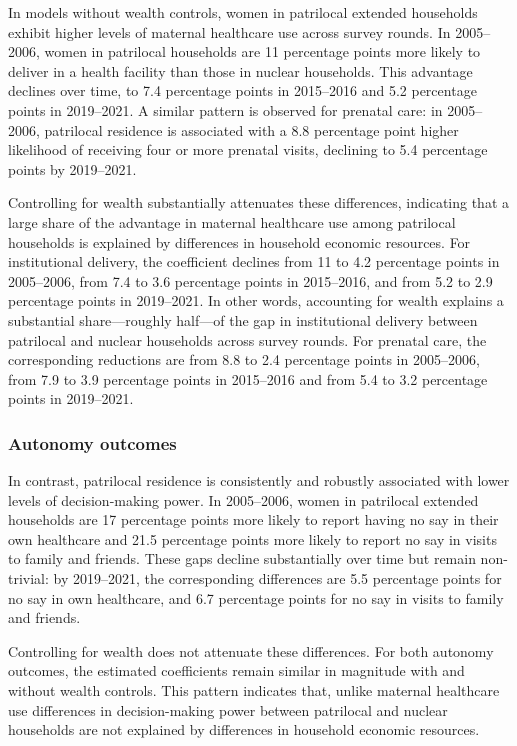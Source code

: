 \documentclass[12pt]{article}
\begin{document}
In models without wealth controls, women in patrilocal extended households exhibit higher levels of maternal healthcare use across survey rounds. In 2005–2006, women in patrilocal households are 11 percentage points more likely to deliver in a health facility than those in nuclear households. This advantage declines over time, to 7.4 percentage points in 2015–2016 and 5.2 percentage points in 2019–2021. A similar pattern is observed for prenatal care: in 2005–2006, patrilocal residence is associated with a 8.8 percentage point higher likelihood of receiving four or more prenatal visits, declining to 5.4 percentage points by 2019–2021.

Controlling for wealth substantially attenuates these differences, indicating that a large share of the advantage in maternal healthcare use among patrilocal households is explained by differences in household economic resources. For institutional delivery, the coefficient declines from 11 to 4.2 percentage points in 2005–2006, from 7.4 to 3.6 percentage points in 2015–2016, and from 5.2 to 2.9 percentage points in 2019–2021. In other words, accounting for wealth explains a substantial share—roughly half—of the gap in institutional delivery between patrilocal and nuclear households across survey rounds. For prenatal care, the corresponding reductions are from 8.8 to 2.4 percentage points in 2005–2006, from 7.9 to 3.9 percentage points in 2015–2016 and from 5.4 to 3.2 percentage points in 2019–2021.

\subsubsection{Autonomy outcomes}

In contrast, patrilocal residence is consistently and robustly associated with lower levels of decision-making power. In 2005–2006, women in patrilocal extended households are 17 percentage points more likely to report having no say in their own healthcare and 21.5 percentage points more likely to report no say in visits to family and friends. These gaps decline substantially over time but remain non-trivial: by 2019–2021, the corresponding differences are 5.5 percentage points for no say in own healthcare, and 6.7 percentage points for no say in visits to family and friends. 

Controlling for wealth does not attenuate these differences. For both autonomy outcomes, the estimated coefficients remain similar in magnitude with and without wealth controls. This pattern indicates that, unlike maternal healthcare use differences in decision-making power between patrilocal and nuclear households are not explained by differences in household economic resources.
\end{document}
